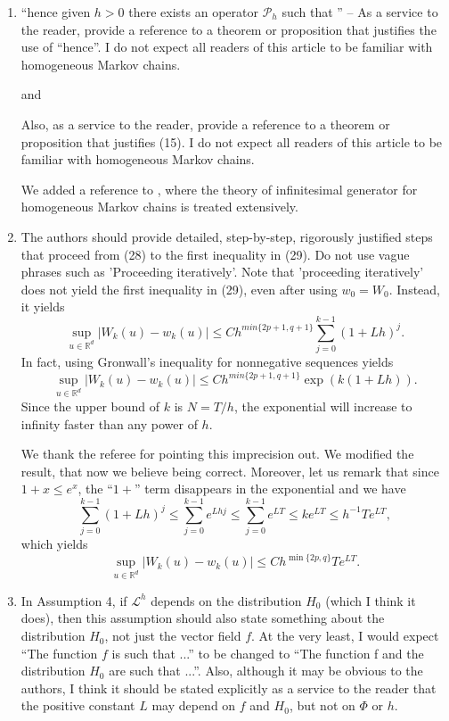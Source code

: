 \documentclass[10pt]{article}
\begin{document}
\begin{enumerate}
	\item 
	\begin{itquote}	
		``hence given $h>0$ there exists an operator $\mathcal{P}_h$ such that '' -- As a service to the reader, provide a reference to a theorem or proposition that justifies the use of ``hence''. I do not expect all readers of this article to be familiar with homogeneous Markov chains.
	\end{itquote}
	and
	\begin{itquote}
		Also, as a service to the reader, provide a reference to a theorem or proposition that justifies (15). I do not expect all readers of this article to be familiar with homogeneous Markov chains.
	\end{itquote}
	We added a reference to \cite[Section 2.3]{Pav14}, where the theory of infinitesimal generator for homogeneous Markov chains is treated extensively.
	\item 
	\begin{itquote} 
		The authors should provide detailed, step-by-step, rigorously justified steps that proceed from (28) to the first inequality in (29). Do not use vague phrases such as 'Proceeding iteratively'. Note that 'proceeding iteratively' does not yield the first inequality in (29), even after using $w_0=W_0$. Instead, it yields $$\sup_{u\in\mathbb{R}^d}\vert W_k(u)-w_k(u)\vert \leq Ch^{min\{2p+1,q+1\}}\sum_{j=0}^{k-1}(1+Lh)^j.$$ In fact, using Gronwall's inequality for nonnegative sequences yields $$\sup_{u\in\mathbb{R}^d}\vert W_k(u)-w_k(u)\vert \leq Ch^{min\{2p+1,q+1\}}\exp\left(k(1+Lh)\right).$$ Since the upper bound of $k$ is $N=T/h$, the exponential will increase to infinity faster than any power of $h$.
	\end{itquote}
	We thank the referee for pointing this imprecision out. We modified the result, that now we believe being correct. Moreover, let us remark that since $1 + x \leq e^x$, the ``$1+$'' term disappears in the exponential and we have 
	\begin{equation*}
		\sum_{j=0}^{k-1}(1+Lh)^j \leq \sum_{j=0}^{k-1} e^{Lhj} \leq \sum_{j=0}^{k-1} e^{LT} \leq ke^{LT} \leq h^{-1} T e^{LT},
	\end{equation*}
	which yields
	\begin{equation*}
		\sup_{u\in\mathbb{R}^d}\vert W_k(u)-w_k(u)\vert \leq Ch^{\min\{2p, q\}} T e^{LT}.
	\end{equation*}
	\item 
	\begin{itquote} 
		In Assumption 4, if $\mathcal{L}^h$ depends on the distribution $H_0$ (which I think it does), then this assumption should also state something about the distribution $H_0$, not just the vector field $f$. At the very least, I would expect ``The function $f$ is such that ...'' to be changed to ``The function f and the distribution $H_0$ are such that ...''. Also, although it may be obvious to the authors, I think it should be stated explicitly as a service to the reader that the positive constant $L$ may depend on $f$ and $H_0$, but not on $\Phi$ or $h$.

\end{itquote}
\end{enumerate}
\end{document}
